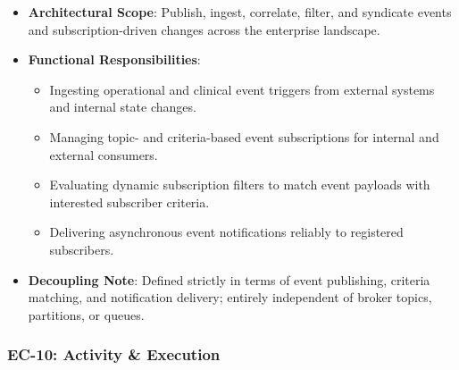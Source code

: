 \begin{itemize}

\item 
\textbf{Architectural Scope}: Publish, ingest, correlate, filter, and syndicate events and subscription-driven changes across the enterprise landscape.



\item 
\textbf{Functional Responsibilities}:


\begin{itemize}

\item 
Ingesting operational and clinical event triggers from external systems and internal state changes.



\item 
Managing topic- and criteria-based event subscriptions for internal and external consumers.



\item 
Evaluating dynamic subscription filters to match event payloads with interested subscriber criteria.



\item 
Delivering asynchronous event notifications reliably to registered subscribers.



\end{itemize}


\item 
\textbf{Decoupling Note}: Defined strictly in terms of event publishing, criteria matching, and notification delivery; entirely independent of broker topics, partitions, or queues.



\end{itemize}
\label{rad:enterprise:184}
\subsubsection*{EC-10: Activity \& Execution}
\label{rad:enterprise:185}

